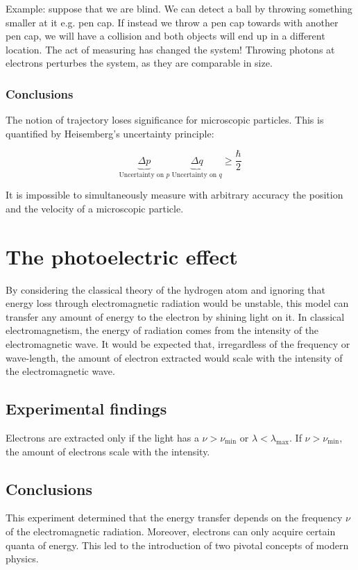 Example: suppose that we are blind. We can detect a ball by throwing something smaller at it e.g. pen cap. If instead we throw a pen cap towards with another pen cap, we will have a collision and both objects will end up in a different location. The act of measuring has changed the system! 
Throwing photons at electrons perturbes the system, as they are comparable in size.

    \subsubsection{Conclusions}
    The notion of trajectory loses significance for microscopic particles.
    This is quantified by Heisemberg's uncertainty principle:

    $$\underbrace{\Delta p}_{\text{Uncertainty on }p}\ \underbrace{\Delta q }_{\text{Uncertainty on }q} \ge \frac{\hbar}{2}$$

    It is impossible to simultaneously measure with arbitrary accuracy the position and the velocity of a microscopic particle.

\section{The photoelectric effect}
By considering the classical theory of the hydrogen atom and ignoring that energy loss through electromagnetic radiation would be unstable, this model can transfer any amount of energy to the electron by shining light on it.
In classical electromagnetism, the energy of radiation comes from the intensity of the electromagnetic wave.
It would be expected that, irregardless of the frequency or wave-length, the amount of electron extracted would scale with the intensity of the electromagnetic wave.

  \subsection{Experimental findings}
  Electrons are extracted only if the light has a $\nu > \nu_{\min}$ or $\lambda<\lambda_{\max}$.
  If $\nu>\nu_{\min}$, the amount of electrons scale with the intensity.

  \subsection{Conclusions}
  This experiment determined that the energy transfer depends on the frequency $\nu$ of the electromagnetic radiation.
  Moreover, electrons can only acquire certain quanta of energy.
  This led to the introduction of two pivotal concepts of modern physics.

